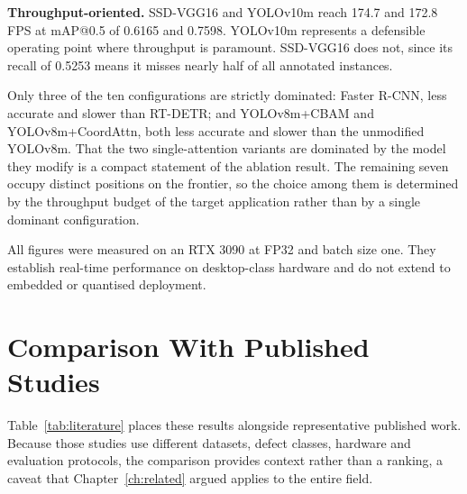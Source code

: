 \documentclass[MScCS]{uccthesis}
\begin{document}
\textbf{Throughput-oriented.} SSD-VGG16 and YOLOv10m reach 174.7 and 172.8 FPS
at mAP@0.5 of 0.6165 and 0.7598. YOLOv10m represents a defensible operating
point where throughput is paramount. SSD-VGG16 does not, since its recall of
0.5253 means it misses nearly half of all annotated instances.

Only three of the ten configurations are strictly dominated: Faster R-CNN, less
accurate and slower than RT-DETR; and YOLOv8m+CBAM and YOLOv8m+CoordAttn, both
less accurate and slower than the unmodified YOLOv8m. That the two
single-attention variants are dominated by the model they modify is a compact
statement of the ablation result. The remaining seven occupy distinct positions
on the frontier, so the choice among them is determined by the throughput
budget of the target application rather than by a single dominant
configuration.

All figures were measured on an RTX 3090 at FP32 and batch size one. They
establish real-time performance on desktop-class hardware and do not extend to
embedded or quantised deployment.

\section{Comparison With Published Studies}
\label{sec:results_literature}

Table~\ref{tab:literature} places these results alongside representative
published work. Because those studies use different datasets, defect classes,
hardware and evaluation protocols, the comparison provides context rather than
a ranking, a caveat that Chapter~\ref{ch:related} argued applies to the
entire field.
\end{document}
